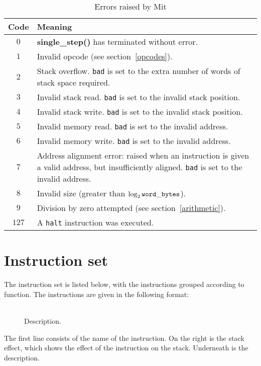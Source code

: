 \documentclass[a4paper]{article}
\newcommand{\spic}[1]{\texttt{\textsl{#1\/}}}
\newlength{\itemwidth}\itemwidth=\textwidth \advance\itemwidth by -0.1in
\newlength{\instname}\instname=1.5in
\newlength{\stackcom}\stackcom=3.0in
\newcommand{\inst}[3]{\item[]\parbox{\itemwidth}%
{\makebox[\instname][l]{\tt #1}%
\makebox[\stackcom][r]{\tt ( \spic{#2} )}\\[0.5ex]#3}}
\begin{document}
\begin{table}[htbp]
\begin{center}
\begin{tabular}{cp{4in}} \toprule
\bf Code & \bf Meaning \\ \midrule
$0$ & {\bf single\_step()} has terminated without error. \\
$1$ & Invalid opcode (see section~\ref{opcodes}). \\
$2$ & Stack overflow. {\tt bad} is set to the extra number of words of stack space required. \\
$3$ & Invalid stack read. {\tt bad} is set to the invalid stack position. \\
$4$ & Invalid stack write. {\tt bad} is set to the invalid stack position. \\
$5$ & Invalid memory read. {\tt bad} is set to the invalid address. \\
$6$ & Invalid memory write. {\tt bad} is set to the invalid address. \\
$7$ & Address alignment error: raised when an instruction is given a valid address, but insufficiently aligned. {\tt bad} is set to the invalid address. \\
$8$ & Invalid size (greater than $\log_2{\tt word\_bytes}$). \\
$9$ & Division by zero attempted (see section~\ref{arithmetic}). \\
$127$ & A {\tt halt} instruction was executed. \\
 \bottomrule
\end{tabular}
\caption{\label{errortable}Errors raised by Mit}
\end{center}
\end{table}


\section{Instruction set}
\label{instset}

The instruction set is listed below,
with the instructions grouped according to function. The
instructions are given in the following format:

\begin{description}
\inst{NAME}{before — after}{Description.}
\end{description}

The first line consists of the name of the instruction. On the right is the
stack effect, which shows the effect of the instruction on the stack.
Underneath is the description.
\end{document}
